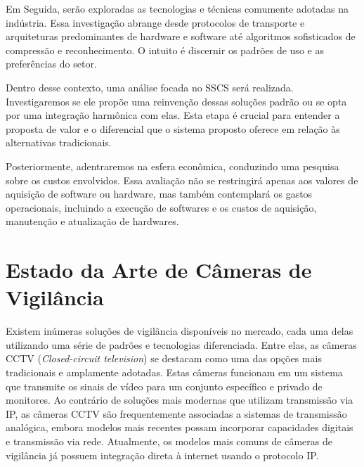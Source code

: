 \documentclass[12pt, %
openright, 
oneside, %
a4paper,    %
brazil]{facom-ufu-abntex2}
\begin{document}
Em Seguida, serão exploradas as tecnologias e técnicas comumente adotadas na
indústria. Essa investigação abrange desde protocolos de transporte e
arquiteturas predominantes de hardware e software até algoritmos sofisticados
de compressão e reconhecimento. O intuito é discernir os padrões de uso e as
preferências do setor.

Dentro desse contexto, uma análise focada no SSCS será realizada.
Investigaremos se ele propõe uma reinvenção dessas soluções padrão ou se opta
por uma integração harmônica com elas. Esta etapa é crucial para entender a
proposta de valor e o diferencial que o sistema proposto oferece em relação às
alternativas tradicionais.

Posteriormente, adentraremos na esfera econômica, conduzindo uma pesquisa sobre
os custos envolvidos. Essa avaliação não se restringirá apenas aos valores de
aquisição de software ou hardware, mas também contemplará os gastos
operacionais, incluindo a execução de softwares e os custos de aquisição,
manutenção e atualização de hardwares.

\section{Estado da Arte de Câmeras de Vigilância}

Existem inúmeras soluções de vigilância disponíveis no mercado, cada uma delas
utilizando uma série de padrões e tecnologias diferenciada. Entre elas, as
câmeras CCTV (\textit{\foreignlanguage{english}{Closed-circuit television}}) se
destacam como uma das opções mais tradicionais e amplamente adotadas. Estas
câmeras funcionam em um sistema que transmite os sinais de vídeo para um
conjunto específico e privado de monitores. Ao contrário de soluções mais
modernas que utilizam transmissão via IP, as câmeras CCTV são frequentemente
associadas a sistemas de transmissão analógica, embora modelos mais recentes
possam incorporar capacidades digitais e transmissão via rede. Atualmente, os
modelos mais comuns de câmeras de vigilância já possuem integração direta à
internet usando o protocolo IP.
\end{document}
